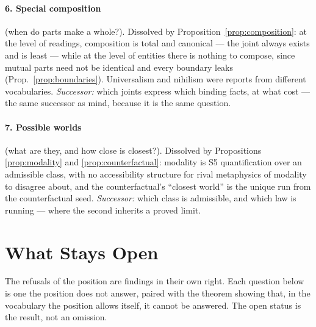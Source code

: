 \documentclass[11pt]{article}
\theoremstyle{remark}
\begin{document}
\paragraph{6. Special composition} (when do parts make a whole?). Dissolved by Proposition~\ref{prop:composition}: at the level of readings, composition is total and canonical --- the joint always exists and is least --- while at the level of entities there is nothing to compose, since mutual parts need not be identical and every boundary leaks (Prop.~\ref{prop:boundaries}). Universalism and nihilism were reports from different vocabularies. \emph{Successor:} which joints express which binding facts, at what cost --- the same successor as mind, because it is the same question.

\paragraph{7. Possible worlds} (what are they, and how close is closest?). Dissolved by Propositions \ref{prop:modality} and \ref{prop:counterfactual}: modality is S5 quantification over an admissible class, with no accessibility structure for rival metaphysics of modality to disagree about, and the counterfactual's ``closest world'' is the unique run from the counterfactual seed. \emph{Successor:} which class is admissible, and which law is running --- where the second inherits a proved limit.

\section{What Stays Open}\label{sec:open}

The refusals of the position are findings in their own right. Each question below is one the position does not answer, paired with the theorem showing that, in the vocabulary the position allows itself, it cannot be answered. The open status is the result, not an omission.
\end{document}
